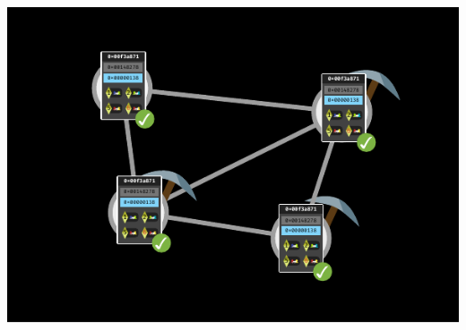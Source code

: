 \documentclass[xcolor=x11names,compress]{beamer}
\begin{document}
\begin{frame}
\begin{overprint}
\begin{center}
			\includegraphics[width=\textwidth,height=0.8\textheight,keepaspectratio]{img/mining/short/03.pdf}
		\end{center}
	\end{overprint}
\end{frame}
\end{document}
